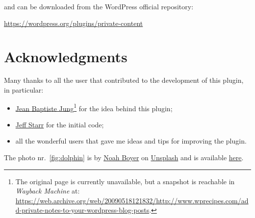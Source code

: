 	\noindent and can be downloaded from the WordPress official repository:
	\begin{center}
	\url{https://wordpress.org/plugins/private-content}
	\end{center}

	\section*{Acknowledgments}

	Many thanks to all the user that contributed to the development of this
	plugin, in particular:

	\begin{itemize}
		\item
		\href{http://www.wprecipes.com/add-private-notes-to-your-wordpress-blog-posts}{Jean
		Baptiste Jung}\footnote{The original page is currently unavailable, but a
		snapshot is reachable in \emph{Wayback Machine} at:
		\url{https://web.archive.org/web/20090518121832/http://www.wprecipes.com/add-private-notes-to-your-wordpress-blog-posts}.}
		for the idea behind this plugin;
		\item \href{http://digwp.com/2010/05/private-content-posts-shortcode}{Jeff Starr}
		for the initial code;
		\item all the wonderful users that gave me ideas and tips for improving
		the plugin.
	\end{itemize}

	\noindent The photo nr.~\vref{fig:dolphin} is by
	\href{https://unsplash.com/@emerald_}{Noah Boyer} on
	\href{https://unsplash.com}{Unsplash} and is available \href{https://unsplash.com/photos/dgBOx1e3Mbs}{here}.

\endgroup